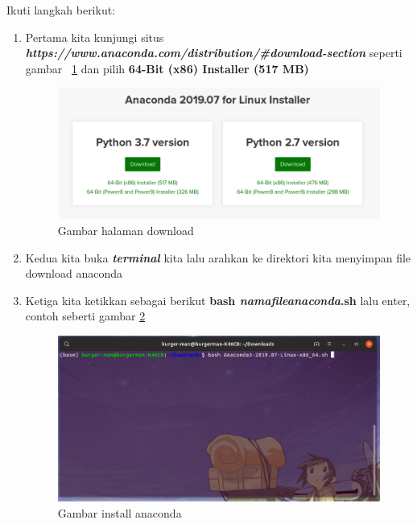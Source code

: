 Ikuti langkah berikut:
\begin{enumerate}
\item Pertama kita kunjungi situs \textbf{\textit{https://www.anaconda.com/distribution/\#download-section}} seperti gambar ~\ref{anacondadownload} dan pilih \textbf{64-Bit (x86) Installer (517 MB)}
\begin{figure}[H]
\centering
\includegraphics[width=1\textwidth]{figures/anacondadownload.png}
\caption{Gambar halaman download}
\label{anacondadownload}
\end{figure}

\item Kedua kita buka \textit{\textbf{terminal}} kita lalu arahkan ke direktori kita menyimpan file download anaconda

\item Ketiga kita ketikkan sebagai berikut \textbf{bash \textit{namafileanaconda}.sh} lalu enter, contoh seberti gambar \ref{anacondabash}
\begin{figure}[H]
\centering
\includegraphics[width=1\textwidth]{figures/anacondabash.png}
\caption{Gambar install anaconda}
\label{anacondabash}
\end{figure}


\end{enumerate}
